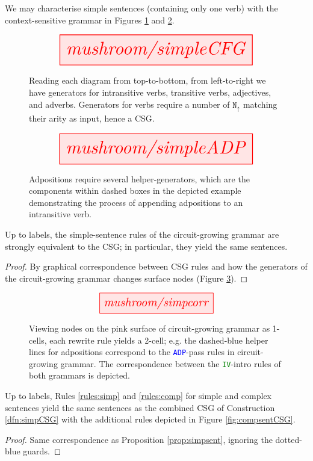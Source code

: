 \begin{construction}\label{dfn:simpCSG}
We may characterise simple sentences (containing only one verb) with the context-sensitive grammar in Figures \ref{fig:simpleCFG} and \ref{fig:simpleADP}.
\end{construction}
\begin{figure}[h!]\label{fig:simpleCFG}
\centering
\[
\resizebox{0.75\textwidth}{!}{\tikzfig{mushroom/simpleCFG}}
\]
\caption{
Reading each diagram from top-to-bottom, from left-to-right we have generators for intransitive verbs, transitive verbs, adjectives, and adverbs. Generators for verbs require a number of $\texttt{N}_{\uparrow}$ matching their arity as input, hence a CSG.
}
\end{figure}
\vspace{-1.5cm}
\begin{figure}[h!]\label{fig:simpleADP}
\centering
\[
\resizebox{0.75\textwidth}{!}{\tikzfig{mushroom/simpleADP}}
\]
\caption{
Adpositions require several helper-generators, which are the components within dashed boxes in the depicted example demonstrating the process of appending adpositions to an intransitive verb.
}
\end{figure}

\begin{proposition}\label{prop:simpsent}
Up to labels, the simple-sentence rules of the circuit-growing grammar are strongly equivalent to the CSG; in particular, they yield the same sentences.
\begin{proof}
By graphical correspondence between CSG rules and how the generators of the circuit-growing grammar changes surface nodes (Figure \ref{fig:correspondence}).
\end{proof}
\end{proposition}
\vspace{-1cm}
\begin{figure}[h!]\label{fig:correspondence}
\centering
\[
\resizebox{0.45\textwidth}{!}{\tikzfig{mushroom/simpcorr}}
\]
\caption{
Viewing nodes on the pink surface of circuit-growing grammar as 1-cells, each rewrite rule yields a 2-cell; e.g. the dashed-blue helper lines for adpositions correspond to the \textcolor{blue}{\texttt{ADP}}-pass rules in circuit-growing grammar. The correspondence between the \textcolor{green}{\texttt{IV}}-intro rules of both grammars is depicted.
}
\end{figure}

\begin{proposition}\label{prop:compsent}
Up to labels, Rules \ref{rules:simp} and \ref{rules:comp} for simple and complex sentences yield the same sentences as the combined CSG of Construction \ref{dfn:simpCSG} with the additional rules depicted in Figure \ref{fig:compsentCSG}.
\end{proposition}
\begin{proof}
Same correspondence as Proposition \ref{prop:simpsent}, ignoring the dotted-blue guards.
\end{proof}


